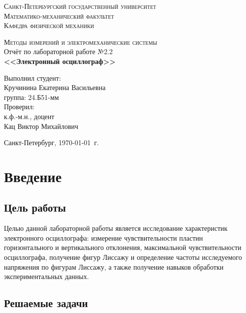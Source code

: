 \documentclass[a4paper,14pt]{extarticle}
\theoremstyle{plain}
\theoremstyle{remark}
\theoremstyle{definition}
\begin{document}
\begin{titlepage}
\begin{center}
\textsc{Санкт-Петербургский государственный университет\\
Математико-механический факультет\\
Кафедра физической механики\\}

\vfill

\textsc{Методы измерений и электромеханические системы\\[3mm]}
Отчёт по лабораторной работе №2.2\\[6mm]


\textbf{\large<<Электронный осциллограф>>}

\vfill
\end{center}

\hfill
\begin{minipage}{.5\textwidth}
Выполнил студент:\\[2mm] 
Кручинина Екатерина Васильевна\\
группа: 24.Б51-мм\\[5mm]

Проверил:\\[2mm] 
к.ф.-м.н., доцент\\
Кац Виктор Михайлович
\end{minipage}%
\vfill
\begin{center}
 Санкт-Петербург, \yeardate\today\ г.
\end{center}
\end{titlepage}
\tableofcontents
\newpage
\section{Введение}

\subsection{Цель работы}
Целью данной лабораторной работы является исследование характеристик электронного осциллографа: измерение чувствительности пластин горизонтального и вертикального отклонения, максимальной чувствительности осциллографа, получение фигур Лиссажу и определение частоты исследуемого напряжения по фигурам Лиссажу, а также получение навыков обработки экспериментальных данных.

\subsection{Решаемые задачи}
\end{document}
